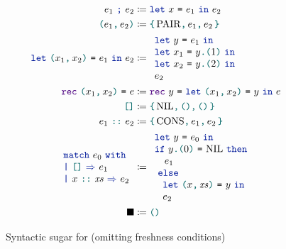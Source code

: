 \begin{figure}[tp]
    \begin{align*}
            \datalangSeq{\datalangExpr_1}{\datalangExpr_2}
            &\coloneqq
            \datalangLet{\datalangVar}{\datalangExpr_1}{\datalangExpr_2}
        \\
            \datalangPair{\datalangExpr_1}{\datalangExpr_2}
            &\coloneqq
            \datalangBlock{\mathrm{PAIR}}{\datalangExpr_1}{\datalangExpr_2}
        \\
            \datalangLet{\datalangPair{\datalangVar_1}{\datalangVar_2}}{\datalangExpr_1}{\datalangExpr_2}
            &\coloneqq
            \begin{array}{l}
                \datalangLet{\datalangVarTwo}{\datalangExpr_1}{\\
                \datalangLet{\datalangVar_1}{\datalangLoad{\datalangVarTwo}{1}}{\\
                \datalangLet{\datalangVar_2}{\datalangLoad{\datalangVarTwo}{2}}{\\
                \datalangExpr_2}}}
            \end{array}
        \\
            \datalangRec{\datalangPair{\datalangVar_1}{\datalangVar_2}}{\datalangExpr}
            &\coloneqq
            \datalangRec{\datalangVarTwo}{
            \datalangLet{\datalangPair{\datalangVar_1}{\datalangVar_2}}{\datalangVarTwo}{\datalangExpr}}
        \\
            \datalangNil
            &\coloneqq
            \datalangBlock{\mathrm{NIL}}{\datalangUnit}{\datalangUnit}
        \\
            \datalangCons{\datalangExpr_1}{\datalangExpr_2}
            &\coloneqq
            \datalangBlock{\mathrm{CONS}}{\datalangExpr_1}{\datalangExpr_2}
        \\
            \datalangMatch{\datalangExpr_0}{\datalangExpr_1}{\datalangVar}{\mathit{\datalangVar s}}{\datalangExpr_2}
            &\coloneqq
            \begin{array}{l}
                \datalangLet{\datalangVarTwo}{\datalangExpr_0}{\\
                \datalangIf{
                    \datalangEq{\datalangLoad{\datalangVarTwo}{0}}{\mathrm{NIL}}
                }{\\ \ \ \ 
                    \datalangExpr_1
                \\}{\\ \ \begin{array}{l}
                    \datalangLet{\datalangPair{\datalangVar}{\mathit{\datalangVar s}}}{\datalangVarTwo}{\\
                    \datalangExpr_2}
                \end{array}}}
            \end{array}
        \\
            \datalangHole
            &\coloneqq
            \datalangUnit
    \end{align*}
    \caption{Syntactic sugar for \DataLang (omitting freshness conditions)}
    \label{fig:sugar}
\end{figure}